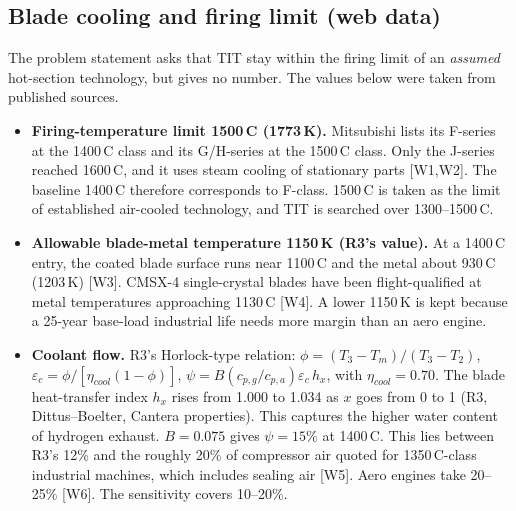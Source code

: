 \documentclass[10.5pt,a4paper]{article}
\begin{document}
\subsection{Blade cooling and firing limit (web data)}\label{sec:cool}
The problem statement asks that TIT stay within the firing limit of an \emph{assumed} hot-section technology, but gives no number. The values below were taken from published sources.
\begin{itemize}[leftmargin=1.2em,itemsep=1pt]
\item \textbf{Firing-temperature limit 1500\,\textdegree C (1773\,K).} Mitsubishi lists its F-series at the 1400\,\textdegree C class and its G/H-series at the 1500\,\textdegree C class. Only the J-series reached 1600\,\textdegree C, and it uses steam cooling of stationary parts [W1,W2]. The baseline 1400\,\textdegree C therefore corresponds to F-class. 1500\,\textdegree C is taken as the limit of established air-cooled technology, and TIT is searched over 1300--1500\,\textdegree C.
\item \textbf{Allowable blade-metal temperature 1150\,K (R3's value).} At a 1400\,\textdegree C entry, the coated blade surface runs near 1100\,\textdegree C and the metal about 930\,\textdegree C (1203\,K) [W3]. CMSX-4 single-crystal blades have been flight-qualified at metal temperatures approaching 1130\,\textdegree C [W4]. A lower 1150\,K is kept because a 25-year base-load industrial life needs more margin than an aero engine.
\item \textbf{Coolant flow.} R3's Horlock-type relation: $\phi=(T_3-T_m)/(T_3-T_2)$, $\varepsilon_c=\phi/[\eta_{cool}(1-\phi)]$, $\psi=B(c_{p,g}/c_{p,a})\varepsilon_c\,h_x$, with $\eta_{cool}=0.70$. The blade heat-transfer index $h_x$ rises from 1.000 to 1.034 as $x$ goes from 0 to 1 (R3, Dittus--Boelter, Cantera properties). This captures the higher water content of hydrogen exhaust. $B=0.075$ gives $\psi=15\%$ at 1400\,\textdegree C. This lies between R3's 12\% and the roughly 20\% of compressor air quoted for 1350\,\textdegree C-class industrial machines, which includes sealing air [W5]. Aero engines take 20--25\% [W6]. The sensitivity covers 10--20\%.
\end{itemize}
\end{document}
